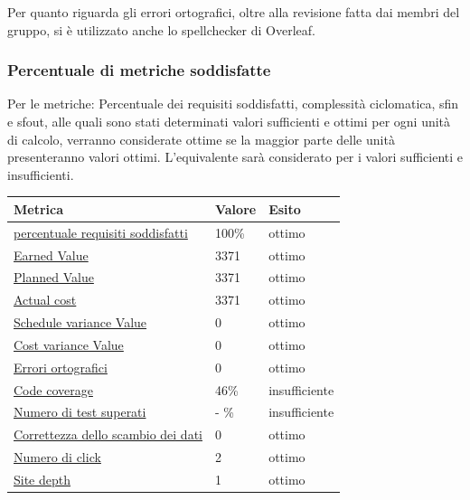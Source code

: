 Per quanto riguarda gli errori ortografici, oltre alla revisione fatta dai membri del gruppo, si è utilizzato anche lo spellchecker di Overleaf.

\subsubsection{Percentuale di metriche soddisfatte}
    Per le metriche: Percentuale dei requisiti soddisfatti, complessità ciclomatica, sfin e sfout, alle quali sono stati determinati valori sufficienti e ottimi per ogni unità di calcolo,
    verranno considerate ottime se la maggior parte delle unità presenteranno valori ottimi. L'equivalente
    sarà considerato per i valori sufficienti e insufficienti. 


    \begin{longtabu} to \textwidth {| X[0.2,c m] | X[0.1,c m] | X[0.1,c m] |}
        \hline
        \textbf{Metrica} &
        \textbf{Valore} &
        \textbf{Esito}\\
        \hline
        \hyperlink{subsubsection.5.1.1}{percentuale requisiti soddisfatti}& 100\% & ottimo \\ 
        \hline
        \hyperlink{subsubsection.5.1.2}{Earned Value} & 3371 & ottimo  \\ 
        \hline
        \hyperlink{subsubsection.5.1.2}{Planned Value} & 3371 & ottimo  \\
        \hline
        \hyperlink{subsubsection.5.1.2}{Actual cost} & 3371 & ottimo  \\
        \hline
        \hyperlink{subsubsection.5.1.2}{Schedule variance Value} & 0 & ottimo  \\
        \hline
        \hyperlink{subsubsection.5.1.2}{Cost variance Value} & 0 & ottimo  \\
        \hline
        \hyperlink{subsubsection.5.2.1}{Errori ortografici} & 0 & ottimo  \\
        \hline
        \hyperlink{subsubsection.5.2.4}{Code coverage} & 46\% & insufficiente \\
        \hline
        \hyperlink{subsubsection.5.2.5}{Numero di test superati} & - \% & insufficiente \\
        \hline
        \hyperlink{subsubsection.5.3.1}{Correttezza dello scambio dei dati} & 0 & ottimo \\
        \hline
        \hyperlink{subsubsection.5.3.2}{Numero di click} & 2 & ottimo \\
        \hline
        \hyperlink{subsubsection.5.3.3}{Site depth} & 1 & ottimo \\

\end{longtabu}
